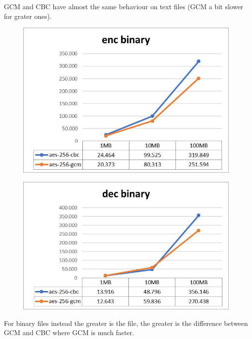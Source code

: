\documentclass[11pt,a4paper]{article}
\begin{document}
GCM and CBC have almost the same behaviour on text files (GCM a bit slower for grater ones).

\begin{figure}[H]
    \centering
        \includegraphics[width=\textwidth]{eb-hw3-1649359.jpg}
\end{figure}
\begin{figure}[H]
    \centering
        \includegraphics[width=\textwidth]{db-hw3-1649359.jpg}
\end{figure}

For binary files instead the greater is the file, the greater is the difference between GCM and CBC where GCM is much faster.
\end{document}
